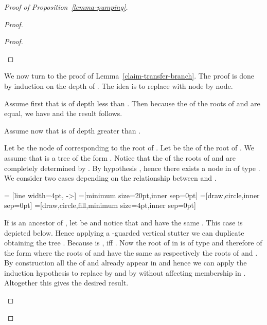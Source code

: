 \begin{proof}[Proof of Proposition~\ref{lemma-pumping}]
\begin{proof}
\begin{proof}
\begin{center}
\end{center}

\end{proof}

  We now turn to the proof of Lemma~\ref{claim-transfer-branch}. The proof is
  done by induction on the depth of . The idea is to replace   with 
  node by node.

  Assume first that  is of depth less than . Then because the \ktype of
  the roots of  and  are equal, we have  and the result follows.

  Assume now that  is of depth greater than . 

  Let  be the node of  corresponding to the root of . Let  be
  the  of the root of . We assume that  is a tree of the
  form . Notice that the \ktype of the roots of  and 
  are completely determined by . By hypothesis ,
  hence there exists a node  in  of type . We consider two
  cases depending on the relationship between  and .

 = [line width=4pt, ->]
=[minimum size=20pt,inner sep=0pt]
=[draw,circle,inner sep=0pt]
=[draw,circle,fill,minimum size=4pt,inner sep=0pt]

\begin{iteMize}{}
\item If  is an ancestor of , let  be  and notice that  and
   have the same \ktype. This case is depicted below. Hence applying a -guarded vertical stutter we
  can duplicate  obtaining the tree . Because  is \ktame,  iff . Now the root of  in  is of type  and therefore of
  the form  where the roots of  and  have the same \ktype
  as respectively the roots of  and . By construction all the
   of  and  already appear in  and hence we can apply
  the induction hypothesis to replace  by  and  by 
  without affecting membership in . Altogether this gives the desired
  result.
\begin{center}
\end{center}
\end{iteMize}
\end{proof}
\end{proof}
